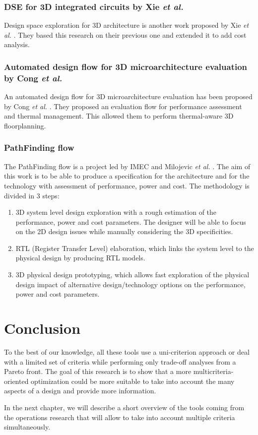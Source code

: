 \subsubsection{DSE for 3D integrated circuits by Xie \textit{et al.}}
Design space exploration for 3D architecture is another work proposed by Xie \textit{et al.} \cite{4735042}. They based this research on their previous one and extended it to add cost analysis.

\subsubsection{Automated design flow for 3D microarchitecture evaluation by Cong \textit{et al.}}
An automated design flow for 3D microarchitecture evaluation has been proposed by Cong \textit{et al.} \cite{1594713}. They proposed an evaluation flow for performance assessment and thermal management. This allowed them to perform thermal-aware 3D floorplanning.

\subsubsection{PathFinding flow}
The PathFinding flow is a project led by IMEC and Milojevic \textit{et al.} \cite{5335663,DBLP:conf/3dic/MilojevicCCRRSAPM09}. The aim of this work is to be able to produce a specification for the architecture and for the technology with assessment of performance, power and cost. The methodology is divided in 3 steps:
\begin{enumerate}
\item 3D system level design exploration with a rough estimation of the performance, power and cost parameters. The designer will be able to focus on the 2D design issues while manually considering the 3D specificities.
\item RTL (Register Transfer Level) elaboration, which links the system level to the physical design by producing RTL models.
\item 3D physical design prototyping, which allows fast exploration of the physical design impact of alternative design/technology options on the performance, power and cost parameters.
\end{enumerate} 

\section{Conclusion}
To the best of our knowledge, all these tools use a uni-criterion approach or deal with a limited set of criteria while performing only trade-off analyses from a Pareto front. The goal of this research is to show that a more multicriteria-oriented optimization could be more suitable to take into account the many aspects of a design and provide more information.

In the next chapter, we will describe a short overview of the tools coming from the operations research that will allow to take into account multiple criteria simultaneously.